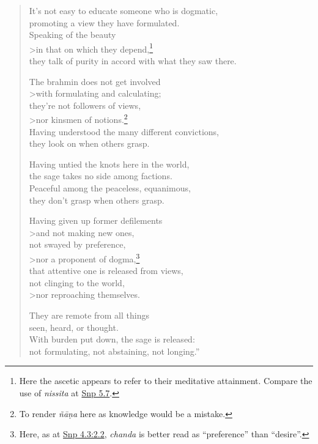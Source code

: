 \documentclass[12pt,openany]{book}%
\begin{document}
\begin{verse}
It’s not easy to educate someone who is dogmatic, \\
promoting a view they have formulated. \\
Speaking of the beauty \\>in that on which they depend,\footnote{Here the ascetic appears to refer to their meditative attainment. Compare the use of \textit{nissita} at \href{https://suttacentral.net/snp5.7/en/sujato}{Snp 5.7}. } \\
they talk of purity in accord with what they saw there. 

The brahmin does not get involved \\>with formulating and calculating; \\
they’re not followers of views, \\>nor kinsmen of notions.\footnote{To render \textit{\textsanskrit{ñāṇa}} here as knowledge would be a mistake. } \\
Having understood the many different convictions, \\
they look on when others grasp. 

Having untied the knots here in the world, \\
the sage takes no side among factions. \\
Peaceful among the peaceless, equanimous, \\
they don’t grasp when others grasp. 

Having given up former defilements \\>and not making new ones, \\
not swayed by preference, \\>nor a proponent of dogma,\footnote{Here, as at \href{https://suttacentral.net/snp4.3/en/sujato\#2.2}{Snp 4.3:2.2}, \textit{chanda} is better read as “preference” than “desire”. } \\
that attentive one is released from views, \\
not clinging to the world, \\>nor reproaching themselves. 

They are remote from all things \\
seen, heard, or thought. \\
With burden put down, the sage is released: \\
not formulating, not abstaining, not longing.” 

%
\end{verse}
\end{document}
